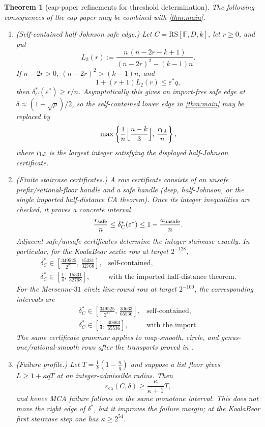 \documentclass[11pt]{amsart}
\newtheorem{theorem}{Theorem}[section]
\theoremstyle{definition}
\theoremstyle{remark}
\newcommand{\F}{\mathbb{F}}
\newcommand{\RS}{\mathrm{RS}}
\newcommand{\eca}{\varepsilon_{\mathrm{ca}}}
\begin{document}
\begin{theorem}[cap-paper refinements for threshold determination]\label{thm:cap-paper-package}
The following consequences of the cap paper \cite{Cho26b} may be combined with \cref{thm:main}.
\begin{enumerate}
\item \textup{(Self-contained half-Johnson safe edge.)} Let $C=\RS[\F,D,k]$, let $r\ge0$, and put
\[
        L_2(r):=
        \frac{n\,(n-2r-k+1)}
             {(n-2r)^2-(k-1)n}.
\]
If $n-2r>0$, $(n-2r)^2>(k-1)n$, and
\[
        1+(r+1)L_2(r)\le \varepsilon^* q,
\]
then $\delta^*_C(\varepsilon^*)\ge r/n$.  Asymptotically this gives an import-free safe edge at $\delta\approx(1-\sqrt\rho)/2$, so the self-contained lower edge in \cref{thm:main} may be replaced by
\[
        \max\left\{\frac1n\Bigl\lfloor\frac{n-k}{3}\Bigr\rfloor,\,
        \frac{r_{\rm hJ}}n\right\},
\]
where $r_{\rm hJ}$ is the largest integer satisfying the displayed half-Johnson certificate.
\item \textup{(Finite staircase certificates.)} A row certificate consists of an unsafe prefix/rational-floor handle and a safe handle \textup(deep, half-Johnson, or the single imported half-distance CA theorem\textup).  Once its integer inequalities are checked, it proves a concrete interval
\[
        \frac{r_{\rm safe}}n
        \le
        \delta^*_C(\varepsilon^*)
        \le
        1-\frac{a_{\rm unsafe}}n .
\]
Adjacent safe/unsafe certificates determine the integer staircase exactly.  In particular, for the KoalaBear sextic row at target $2^{-128}$,
\[
\begin{array}{ll}
        \delta^*_C\in
        \left[\frac{349525}{2^{21}},\,\frac{15331}{32768}\right],
        &\text{self-contained,}\\[2mm]
        \delta^*_C\in
        \left[\frac14,\,\frac{15331}{32768}\right],
        &\text{with the imported half-distance theorem.}
\end{array}
\]
For the Mersenne-$31$ circle line-round row at target $2^{-100}$, the corresponding intervals are
\[
\begin{array}{ll}
        \delta^*_C\in
        \left[\frac{349525}{2^{21}},\,\frac{30663}{65536}\right],
        &\text{self-contained,}\\[2mm]
        \delta^*_C\in
        \left[\frac14,\,\frac{30663}{65536}\right],
        &\text{with the import.}
\end{array}
\]
The same certificate grammar applies to map-smooth, circle, and genus-one/rational-smooth rows after the transports proved in \cite{Cho26b}.
\item \textup{(Failure profile.)} Let $T=\frac1k(1-\frac nq)$ and suppose a list floor gives $L\ge1+\kappa qT$ at an integer-admissible radius.  Then
\[
        \eca(C,\delta)\ge\frac{\kappa}{\kappa+1}T,
\]
and hence MCA failure follows on the same monotone interval.  This does not move the right edge of $\delta^*$, but it improves the failure margin; at the KoalaBear first staircase step one has $\kappa\ge2^{54}$.
\end{enumerate}
\end{theorem}
\end{document}
